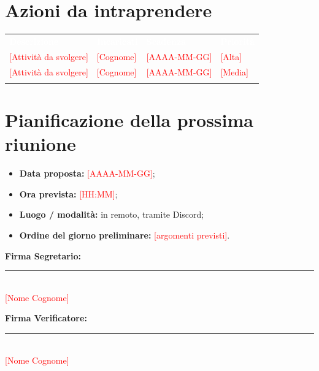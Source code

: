 \documentclass[12pt,a4paper]{article}
\newcommand{\ph}[1]{\textcolor{red}{[#1]}}                        %
\newcommand{\thc}[1]{\textcolor{white}{\textbf{#1}}}              %
\newcommand{\rl}{\arrayrulecolor{bfline}\hline}                   %
\newcommand{\tightlist}{\setlength{\itemsep}{1pt}\setlength{\parskip}{0pt}}
\begin{document}
\newpage

\hypertarget{azioni-da-intraprendere}{%
\section{Azioni da intraprendere}}

\begin{center}
\begin{tabularx}{\linewidth}{>{\hsize=2.0\hsize\raggedright\arraybackslash}X >{\hsize=1.0\hsize\raggedright\arraybackslash}X >{\hsize=0.5\hsize\centering\arraybackslash}X >{\hsize=0.5\hsize\centering\arraybackslash}X}
\rowcolor{bfblue}\thc{Descrizione} & \thc{Incaricati} & \thc{Scadenza} & \thc{Priorità} \\
\ph{Attività da svolgere} & \ph{Cognome} & \ph{AAAA-MM-GG} & \ph{Alta} \\ \rl
\ph{Attività da svolgere} & \ph{Cognome} & \ph{AAAA-MM-GG} & \ph{Media} \\ \rl
\end{tabularx}
\end{center}

\hypertarget{prossima-riunione}{%
\section{Pianificazione della prossima riunione}}

\begin{itemize}
\tightlist
\item \textbf{Data proposta:} \ph{AAAA-MM-GG};
\item \textbf{Ora prevista:} \ph{HH:MM};
\item \textbf{Luogo / modalità:} in remoto, tramite Discord;
\item \textbf{Ordine del giorno preliminare:} \ph{argomenti previsti}.
\end{itemize}

\vspace{35pt}
\noindent
\begin{minipage}[t]{0.45\textwidth}
\textbf{Firma Segretario:}\\[18pt]
\rule{55mm}{0.5pt}\\[2pt]
\small \ph{Nome Cognome}
\end{minipage}
\hfill
\begin{minipage}[t]{0.45\textwidth}
\begin{flushright}
\textbf{Firma Verificatore:}\\[18pt]
\rule{55mm}{0.5pt}\\[2pt]
\small \ph{Nome Cognome}
\end{flushright}
\end{minipage}
\end{document}
